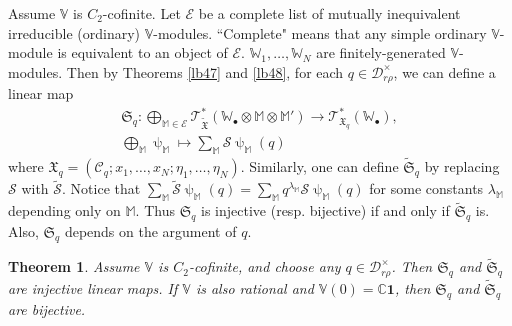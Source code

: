 \documentclass[11pt,b5paper,notitlepage]{article}
\theoremstyle{definition}
\theoremstyle{plain}
\newtheorem{thm}[df]{Theorem}
\newcommand{\fk}{\mathfrak}
\newcommand{\mc}{\mathcal}
\newcommand{\wtd}{\widetilde}
\newcommand{\id}{\mathbf{1}}
\newcommand{\scr}{\mathscr}
\newcommand{\blt}{\bullet}
\newcommand{\Vbb}{\mathbb V}
\newcommand{\Wbb}{\mathbb W}
\newcommand{\Mbb}{\mathbb M}
\newcommand{\Cbb}{\mathbb C}
\numberwithin{equation}{section}
\begin{document}
Assume $\Vbb$ is $C_2$-cofinite. Let $\mc E$ be a complete list of mutually inequivalent irreducible (ordinary)   $\Vbb$-modules. ``Complete" means that any simple ordinary $\Vbb$-module is equivalent to an object of $\mc E$. $\Wbb_1,\dots,\Wbb_N$ are finitely-generated $\Vbb$-modules. Then by Theorems \ref{lb47} and \ref{lb48}, for each $q\in\mc D_{r\rho}^\times$, we can define a \index{Sq@$\fk S_q,\wtd{\fk S}_q$} linear map
\begin{gather}
\fk S_q:\bigoplus_{\Mbb\in\mc E}\scr T_{\wtd{\fk X}}^*(\Wbb_\blt\otimes\Mbb\otimes\Mbb')\rightarrow\scr T_{\fk X_q}^*(\Wbb_\blt),\label{eq92}\\
\bigoplus_\Mbb\uppsi_\Mbb\mapsto \sum_\Mbb\mc S\uppsi_\Mbb(q)\nonumber
\end{gather}
where $\fk X_q=(\mc C_q;x_1,\dots,x_N;\eta_1,\dots,\eta_N)$. Similarly, one can define $\wtd{\fk S}_q$ by replacing $\mc S$ with $\wtd{\mc S}$. Notice that $\sum_\Mbb\wtd{\mc S}\uppsi_\Mbb(q)=\sum_\Mbb q^{\lambda_\Mbb}\mc S\uppsi_\Mbb(q)$ for some constants $\lambda_\Mbb$ depending only on $\Mbb$. Thus $\fk S_q$ is injective (resp. bijective) if and only if $\wtd{\fk S}_q$ is. Also, $\fk S_q$ depends on the argument of $q$.


\begin{thm}\label{lb49}
Assume $\Vbb$ is $C_2$-cofinite, and choose any $q\in\mc D_{r\rho}^\times$. Then $\fk S_q$ and $\wtd{\fk S}_q$ are injective linear maps. If $\Vbb$ is also rational and $\Vbb(0)=\Cbb\id$, then $\fk S_q$ and $\wtd{\fk S}_q$ are bijective.
\end{thm}
\end{document}
